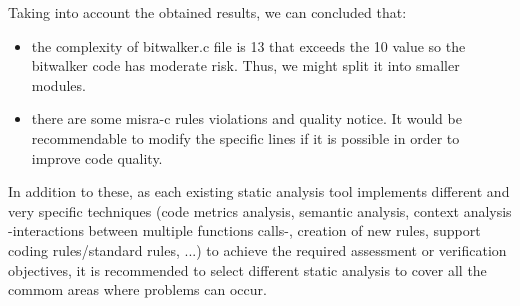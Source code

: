 Taking into account the obtained results, we can concluded that:
\begin{itemize}
\item the complexity of bitwalker.c file is 13 that exceeds the 10 value so the bitwalker code has moderate risk. Thus, we might split it into smaller modules.
\item there are some misra-c rules violations and quality notice. It would be recommendable to modify the specific lines if it is possible in order to improve code quality.
\end{itemize}

In addition to these, as each existing static analysis tool implements different and very specific techniques (code metrics analysis, semantic analysis, context analysis -interactions between multiple functions calls-, creation of new rules, support coding rules/standard rules, ...) to achieve the required assessment or verification objectives, it is recommended to select different static analysis to cover all the commom areas where problems can occur.